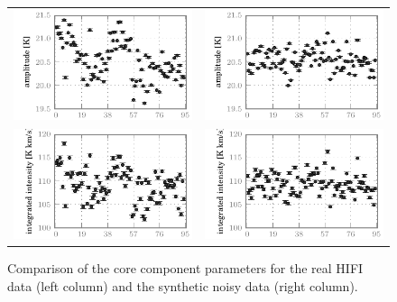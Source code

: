 \begin{figure}[p]
\begin{tabular}{@{}c@{}c@{}}
            \includegraphics{spread_98_core_ampl_corrected}&
            \includegraphics{spread_98_core_ampl_noisy}    \\
            \includegraphics{spread_98_core_iint_corrected}&
            \includegraphics{spread_98_core_iint_noisy}    \\
            \bottomrule
        \end{tabular}
        \caption{
            Comparison of the  core component parameters
            for the real HIFI data (left column)
            and the synthetic noisy data (right column).
    }
        \label{fig:fit_core_98}
    \end{figure}

